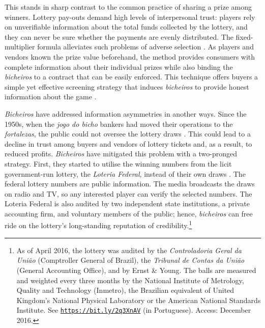 \documentclass[a4paper,12pt]{article}
\begin{document}
This stands in sharp contrast to the common practice of sharing a prize among winners. Lottery pay-outs demand high levels of interpersonal trust: players rely on unverifiable information about the total funds collected by the lottery, and they can never be sure whether the payments are evenly distributed. The fixed-multiplier formula alleviates such problems of adverse selection \citep{akerlof1970market, cohen2010testing, levin2001information}. As players and vendors known the prize value beforehand, the method provides consumers with complete information about their individual prizes while also binding the \emph{bicheiros} to a contract that can be easily enforced. This technique offers buyers a simple yet effective screening strategy that induces \emph{bicheiros} to provide honest information about the game \citep{spence1973job, stiglitz1981credit}.

\emph{Bicheiros} have addressed information asymmetries in another ways. Since the 1950s, when the \emph{jogo do bicho} bankers had moved their operations to the \emph{fortalezas}, the public could not oversee the lottery draws \citep[259]{chazkel2011laws}. This could lead to a decline in trust among buyers and vendors of lottery tickets and, as a result, to reduced profits. \emph{Bicheiros} have mitigated this problem with a two-pronged strategy. First, they started to utilise the winning numbers from the licit government-run lottery, the \emph{Loteria Federal}, instead of their own draws \citetext{\citealp[546]{chazkel2007beyond}; \citealp[89]{labronici2012paratodos}; \citealp[39-40]{mello1989historia}}. The federal lottery numbers are public information. The media broadcasts the draws on radio and TV, so any interested player can verify the selected numbers. The Loteria Federal is also audited by two independent state institutions, a private accounting firm, and voluntary members of the public; hence, \emph{bicheiros} can free ride on the lottery's long-standing reputation of credibility.\footnote{As of April 2016, the lottery was audited by the \emph{Controladoria Geral da União} (Comptroller General of Brazil), the \emph{Tribunal de Contas da União} (General Accounting Office), and by Ernst \& Young. The balls are measured and weighted every three months by the National Institute of Metrology, Quality and Technology (Inmetro), the Brazilian equivalent of United Kingdom's National Physical Laboratory or the American National Standards Institute. See \href{http://noticias.uol.com.br/cotidiano/ultimas-noticias/2016/04/08/auditoria-dos-sorteios-da-caixa-e-confiavel-veja-como-e-o-processo.htm}{\texttt{https://bit.ly/2q3XnAV}} (in Portuguese). Access: December 2016.}
\end{document}
